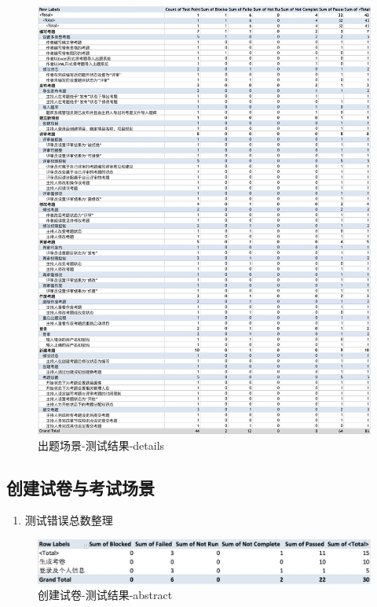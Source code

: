 \documentclass[hyperref, a4paper]{ctexart}
\providecommand{\tightlist}{%
  \setlength{\itemsep}{0pt}\setlength{\parskip}{0pt}}
\begin{document}
\begin{figure}
\centering
\includegraphics{screenshoots/PivotTable_Details.png}
\caption{出题场景-测试结果-details}
\end{figure}

\hypertarget{ux521bux5efaux8bd5ux5377ux4e0eux8003ux8bd5ux573aux666f-1}{%
\subsection{创建试卷与考试场景}\label{ux521bux5efaux8bd5ux5377ux4e0eux8003ux8bd5ux573aux666f-1}}

\begin{enumerate}
\def\labelenumi{\arabic{enumi}.}
\tightlist
\item
  测试错误总数整理
\end{enumerate}

\begin{figure}
\centering
\includegraphics{screenshoots/PivotTable_Abstract_2.png}
\caption{创建试卷-测试结果-abstract}
\end{figure}
\end{document}

